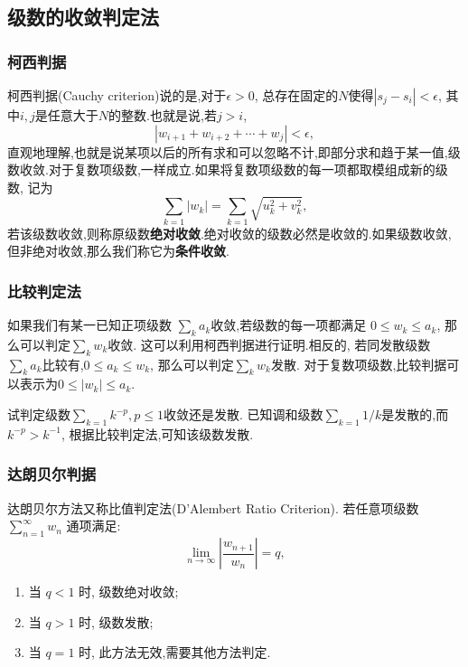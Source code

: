 \subsection{级数的收敛判定法}

\subsubsection{柯西判据}
柯西判据(Cauchy criterion)说的是,对于$\epsilon>0$, 总存在固定的$N$使得$|s_j - s_i|< \epsilon$, 其中$i,j$是任意大于$N$的整数.也就是说,若$j>i$,
\begin{equation}
    | w_{i+1} + w_{i+2} + \cdots + w_{j} | < \epsilon ,
\end{equation}
直观地理解,也就是说某项以后的所有求和可以忽略不计,即部分求和趋于某一值,级数收敛.对于复数项级数,一样成立.如果将复数项级数的每一项都取模组成新的级数,
记为
\begin{equation}
    \sum_{k=1} |w_k| = \sum_{k=1}\sqrt { u_k^2 + v_k^2},
\end{equation}
若该级数收敛,则称原级数\textbf{绝对收敛}.绝对收敛的级数必然是收敛的.如果级数收敛,但非绝对收敛,那么我们称它为\textbf{条件收敛}.

\subsubsection{比较判定法}
如果我们有某一已知正项级数 $\sum_k a_k$收敛,若级数的每一项都满足 $0 \leq w_k \leq a_k$, 那么可以判定$\sum_k w_k$收敛.
这可以利用柯西判据进行证明.相反的, 若同发散级数$\sum_{k} a_k$比较有,$0 \leq a_k  \leq w_k$, 那么可以判定$\sum_k w_k$发散.
对于复数项级数,比较判据可以表示为$0 \leq |w_k| \leq a_k$.

\begin{examplebox}{试判定级数$\sum_{k=1} k^{-p}, p\leq 1$收敛还是发散.}
    已知调和级数$\sum_{k=1}1/k$是发散的,而 $k^{-p} > k^{-1}$, 根据比较判定法,可知该级数发散.
\end{examplebox}

\subsubsection{达朗贝尔判据}
达朗贝尔方法又称比值判定法(D'Alembert Ratio Criterion).
若任意项级数 $\sum_{n=1}^{\infty} w_n$ 通项满足:
$$
\lim _{n \to \infty}\left|\frac{w_{n+1}}{w_n}\right|=q ,
$$
\begin{enumerate}
    \item 当 $q<1$ 时, 级数绝对收敛;
    \item 当 $q>1$ 时, 级数发散;
    \item 当 $q=1$ 时, 此方法无效,需要其他方法判定.
\end{enumerate}

